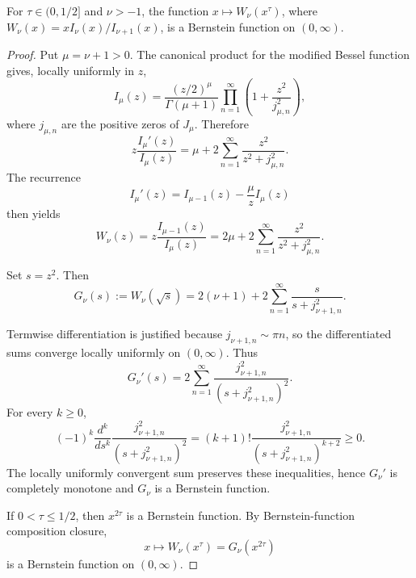 \begin{lemma}[Yang Tian Bessel W\_nu x power tau Bernstein conjecture for tau <= 1/2 and nu > -1]
\label{res:yang-tian-bessel-w-bernstein-conjecture}
For \(\tau\in(0,1/2]\) and \(\nu>-1\), the function \(x\mapsto W_\nu(x^\tau)\), where \(W_\nu(x)=xI_\nu(x)/I_{\nu+1}(x)\), is a Bernstein function on \((0,\infty)\).
\end{lemma}
\begin{proof}
Put \(\mu=\nu+1>0\). The canonical product for the modified Bessel function gives, locally uniformly in \(z\),
\[
I_\mu(z)=\frac{(z/2)^\mu}{\Gamma(\mu+1)}
\prod_{n=1}^{\infty}\left(1+\frac{z^2}{j_{\mu,n}^2}\right),
\]
where \(j_{\mu,n}\) are the positive zeros of \(J_\mu\). Therefore
\[
z\frac{I_\mu'(z)}{I_\mu(z)}
=\mu+2\sum_{n=1}^{\infty}\frac{z^2}{z^2+j_{\mu,n}^2}.
\]
The recurrence
\[
I_\mu'(z)=I_{\mu-1}(z)-\frac{\mu}{z}I_\mu(z)
\]
then yields
\[
W_\nu(z)
=z\frac{I_{\mu-1}(z)}{I_\mu(z)}
=2\mu+2\sum_{n=1}^{\infty}\frac{z^2}{z^2+j_{\mu,n}^2}.
\]

Set \(s=z^2\). Then
\[
G_\nu(s):=W_\nu(\sqrt s)
=2(\nu+1)+2\sum_{n=1}^{\infty}\frac{s}{s+j_{\nu+1,n}^2}.
\]

Termwise differentiation is justified because \(j_{\nu+1,n}\sim \pi n\), so the differentiated sums converge locally uniformly on \((0,\infty)\). Thus
\[
G_\nu'(s)
=2\sum_{n=1}^{\infty}
\frac{j_{\nu+1,n}^2}{(s+j_{\nu+1,n}^2)^2}.
\]
For every \(k\ge0\),
\[
(-1)^k\frac{d^k}{ds^k}
\frac{j_{\nu+1,n}^2}{(s+j_{\nu+1,n}^2)^2}
=
(k+1)!\frac{j_{\nu+1,n}^2}{(s+j_{\nu+1,n}^2)^{k+2}}
\ge0.
\]
The locally uniformly convergent sum preserves these inequalities, hence \(G_\nu'\) is completely monotone and \(G_\nu\) is a Bernstein function.

If \(0<\tau\le1/2\), then \(x^{2\tau}\) is a Bernstein function. By Bernstein-function composition closure,
\[
x\mapsto W_\nu(x^\tau)=G_\nu(x^{2\tau})
\]
is a Bernstein function on \((0,\infty)\).
\end{proof}


